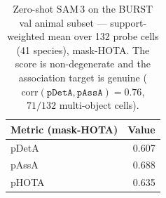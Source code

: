 \begin{table}[htbp]\centering
  \caption[BURST measurement]{Zero-shot SAM\,3 on the BURST val animal subset --- support-weighted mean over 132 probe cells
  (41 species), mask-HOTA. The score is non-degenerate and the association target is genuine
  ($\mathrm{corr}(\texttt{pDetA},\texttt{pAssA})=0.76$, $71/132$ multi-object cells).}
  \label{tab:gate1_burst}
  \begin{tabular}{lr}
    \toprule
    Metric (mask-HOTA) & Value \\
    \midrule
    pDetA & 0.607 \\
    pAssA & 0.688 \\
    pHOTA & 0.635 \\
    \bottomrule
  \end{tabular}
\end{table}
